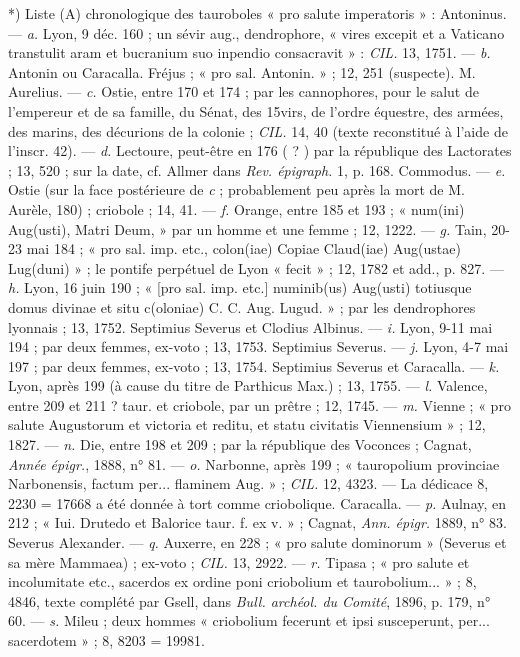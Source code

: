 \documentclass[a4paper, 11pt, oneside, polutonikogreek, french]{article}
\begin{document}
*) Liste (A) chronologique des tauroboles « pro salute imperatoris » :  
Antoninus. --- \emph{a.} Lyon, 9 déc. 160 ; un sévir aug., dendrophore, « vires excepit et a Vaticano transtulit aram et bucranium suo inpendio consacravit » : \emph{CIL.} 13, 1751. --- \emph{b.} Antonin ou Caracalla. Fréjus ; « pro sal. Antonin. » ; 12, 251 (suspecte).  
M. Aurelius. --- \emph{c.} Ostie, entre 170 et 174 ; par les cannophores, pour le salut de l'empereur et de sa famille, du Sénat, des 15virs, de l'ordre équestre, des armées, des marins, des décurions de la colonie ; \emph{CIL.} 14, 40 (texte reconstitué à l'aide de l'inscr. 42). --- \emph{d.} Lectoure, peut-être en 176 ( ? ) par la république des Lactorates ; 13, 520 ; sur la date, cf. Allmer dans \emph{Rev. épigraph.} 1, p. 168.  
Commodus. --- \emph{e.} Ostie (sur la face postérieure de \emph{c} ; probablement peu après la mort de M. Aurèle, 180) ; criobole ; 14, 41. --- \emph{f.} Orange, entre 185 et 193 ; « num(ini) Aug(usti), Matri Deum, » par un homme et une femme ; 12, 1222. --- \emph{g.} Tain, 20-23 mai 184 ; « pro sal. imp. etc., colon(iae) Copiae Claud(iae) Aug(ustae) Lug(duni) » ; le pontife perpétuel de Lyon « fecit » ; 12, 1782 et add., p. 827. --- \emph{h.} Lyon, 16 juin 190 ; « [pro sal. imp. etc.] numinib(us) Aug(usti) totiusque domus divinae et situ c(oloniae) C. C. Aug. Lugud. » ; par les dendrophores lyonnais ; 13, 1752.  
Septimius Severus et Clodius Albinus. --- \emph{i.} Lyon, 9-11 mai 194 ; par deux femmes, ex-voto ; 13, 1753.  
Septimius Severus. --- \emph{j.} Lyon, 4-7 mai 197 ; par deux femmes, ex-voto ; 13, 1754.  
Septimius Severus et Caracalla. --- \emph{k.} Lyon, après 199 (à cause du titre de Parthicus Max.) ; 13, 1755. --- \emph{l.} Valence, entre 209 et 211 ? taur. et criobole, par un prêtre ; 12, 1745. --- \emph{m.} Vienne ; « pro salute Augustorum et victoria et reditu, et statu civitatis Viennensium » ; 12, 1827. --- \emph{n.} Die, entre 198 et 209 ; par la république des Voconces ; Cagnat, \emph{Année épigr.}, 1888, n° 81. --- \emph{o.} Narbonne, après 199 ; « tauropolium provinciae Narbonensis, factum per... flaminem Aug. » ; \emph{CIL.} 12, 4323. --- La dédicace 8, 2230 = 17668 a été donnée à tort comme criobolique.  
Caracalla. --- \emph{p.} Aulnay, en 212 ; « Iui. Drutedo et Balorice taur. f. ex v. » ; Cagnat, \emph{Ann. épigr.} 1889, n° 83.  
Severus Alexander. --- \emph{q.} Auxerre, en 228 ; « pro salute dominorum » (Severus et sa mère Mammaea) ; ex-voto ; \emph{CIL.} 13, 2922. --- \emph{r.} Tipasa ; « pro salute et incolumitate etc., sacerdos ex ordine poni criobolium et taurobolium... » ; 8, 4846, texte complété par Gsell, dans \emph{Bull. archéol. du Comité}, 1896, p. 179, n° 60. --- \emph{s.} Mileu ; deux hommes « criobolium fecerunt et ipsi susceperunt, per... sacerdotem » ; 8, 8203 = 19981.  
\end{document}
